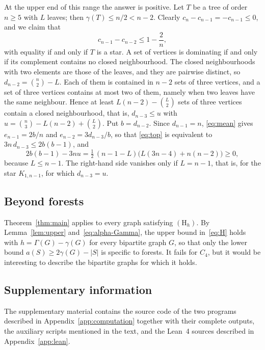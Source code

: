 \documentclass[smallextended,envcountsect,envcountsame]{svjour3}
\begin{document}
At the upper end of this range the answer is positive. Let $T$ be a tree of
order $n\ge5$ with $L$ leaves; then $\gamma(T)\le n/2<n-2$. Clearly
$c_n-c_{n-1}=-c_{n-1}\le0$, and we claim that
\begingroup\small\begin{equation}\label{eq:top}
  c_{n-1}-c_{n-2}\le1-\frac2n ,
\end{equation}\endgroup
with equality if and only if $T$ is a star. A set of vertices is dominating if
and only if its complement contains no closed neighbourhood. The closed
neighbourhoods with two elements are those of the leaves, and they are
pairwise distinct, so $d_{n-2}=\binom n2-L$. Each of them is contained in
$n-2$ sets of three vertices, and a set of three vertices contains at most
two of them, namely when two leaves have the same neighbour. Hence at least
$L(n-2)-\binom L2$ sets of three vertices contain a closed neighbourhood, that
is, $d_{n-3}\le u$ with $u=\binom n3-L(n-2)+\binom L2$. Put $b=d_{n-2}$. Since
$d_{n-1}=n$, \eqref{eq:mean} gives $e_{n-1}=2b/n$ and $e_{n-2}=3d_{n-3}/b$, so
that \eqref{eq:top} is equivalent to $3n\,d_{n-3}\le2b(b-1)$, and
\begingroup\small\[
  2b(b-1)-3nu=\tfrac12\,(n-1-L)\bigl(L(3n-4)+n(n-2)\bigr)\ge0 ,
\]\endgroup
because $L\le n-1$. The right-hand side vanishes only if $L=n-1$, that is,
for the star $K_{1,n-1}$, for which $d_{n-3}=u$.

\subsection*{Beyond forests}
Theorem~\ref{thm:main} applies to every graph satisfying
$(\mathrm{H}_h)$. By Lemma~\ref{lem:upper} and~\eqref{eq:alpha-Gamma}, the upper
bound in~\eqref{eq:H} holds with $h=\Gamma(G)-\gamma(G)$ for every bipartite
graph $G$, so that only the lower bound $a(S)\ge2\gamma(G)-|S|$ is specific to
forests. It fails for $C_4$, but it would be interesting to describe the
bipartite graphs for which it holds.




\subsection*{Supplementary information}
The supplementary material contains the source code of the two programs
described in Appendix~\ref{app:computation} together with their complete
outputs, the auxiliary scripts mentioned in the text, and the Lean~4 sources
described in Appendix~\ref{app:lean}.
\end{document}
